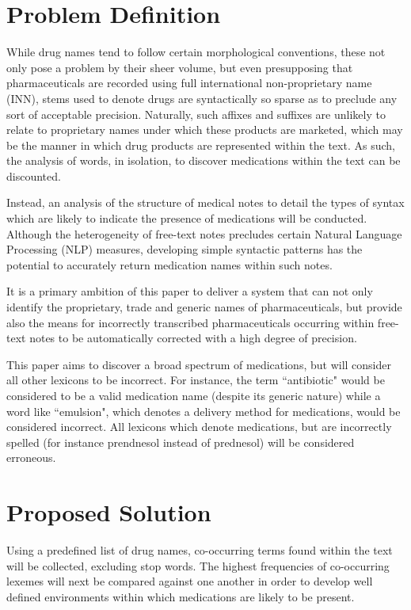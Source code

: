 \section{Problem Definition}

 While drug names tend to follow certain morphological conventions, these not only pose a problem by their sheer volume, but even presupposing that pharmaceuticals are recorded using full international non-proprietary name \\ (INN),\cite{dunne2013review} stems used to denote drugs are syntactically so sparse as to preclude any sort of acceptable precision. Naturally, such affixes and suffixes are unlikely to relate to proprietary names under which these products are marketed, which may be the manner in which drug products are represented within the text. As such, the analysis of words, in isolation, to discover medications within the text can be discounted. 
 

Instead, an analysis of the structure of medical notes to detail the types of syntax which are likely to indicate the presence of medications will be conducted. Although the heterogeneity of free-text notes precludes certain Natural Language Processing (NLP) measures, developing simple syntactic patterns has the potential to accurately return medication names within such notes.

It is a primary ambition of this paper to deliver a system that can not only identify the proprietary, trade and generic names of pharmaceuticals, but provide also the means for incorrectly transcribed pharmaceuticals occurring within free-text notes to be automatically corrected with a high degree of precision. 

This paper aims to discover a broad spectrum of medications, but will consider all other lexicons to be incorrect. For instance, the term ``antibiotic" would be considered to be a valid medication name (despite its generic nature) while a word like ``emulsion", which denotes a delivery method for medications, would be considered incorrect. All lexicons which denote medications, but are incorrectly spelled (for instance prendnesol instead of prednesol) will be considered erroneous.  

\section{Proposed Solution}

Using a predefined list of drug names, co-occurring terms found within the text will be collected, excluding stop words.  The highest frequencies of co-occurring lexemes will next be compared against one another in order to develop well defined environments within which medications are likely to be present. 

